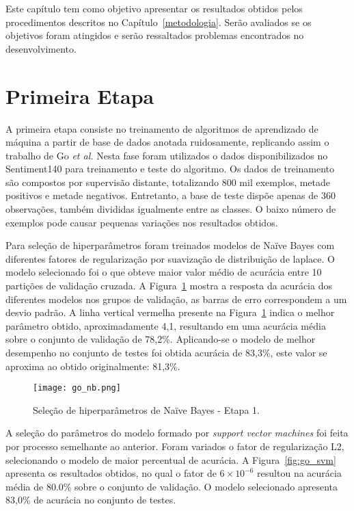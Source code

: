 Este capítulo tem como objetivo apresentar os resultados obtidos pelos procedimentos descritos no
Capítulo~\ref{metodologia}.
Serão avaliados se os objetivos foram atingidos e serão ressaltados problemas encontrados no desenvolvimento.

\section{Primeira Etapa}

A primeira etapa consiste no treinamento de algoritmos de aprendizado de máquina a partir de base de dados anotada
ruidosamente, replicando assim o trabalho de Go \textit{et al.}
Nesta fase foram utilizados o dados disponibilizados no Sentiment140 para treinamento e teste do algoritmo.
Os dados de treinamento são compostos por supervisão distante, totalizando 800 mil exemplos, metade positivos e metade
negativos.
Entretanto, a base de teste dispõe apenas de 360 observações, também divididas igualmente entre as classes.
O baixo número de exemplos pode causar pequenas variações nos resultados obtidos.

Para seleção de hiperparâmetros foram treinados modelos de Naïve Bayes com diferentes fatores de regularização por
suavização de distribuição de laplace.
O modelo selecionado foi o que obteve maior valor médio de acurácia entre 10 partições de validação cruzada.
A Figura~\ref{fig:go_nb} mostra a resposta da acurácia dos diferentes modelos nos grupos de validação, as barras de erro
correspondem a um desvio padrão.
A linha vertical vermelha presente na Figura~\ref{fig:go_nb} indica o melhor parâmetro obtido, aproximadamente 4,1,
resultando em uma acurácia média sobre o conjunto de validação de 78,2\%.
Aplicando-se o modelo de melhor desempenho no conjunto de testes foi obtida acurácia de 83,3\%, este valor se aproxima
ao obtido originalmente: 81,3\%.

\begin{figure}
\begin{center} {
    \begin{center}
    \texttt{[image: go\_nb.png]}
    \caption{Seleção de hiperparâmetros de Naïve Bayes - Etapa 1.}
    \label{fig:go_nb}
    \end{center}
}
\end{center}
\end{figure}

A seleção do parâmetros do modelo formado por \textit{support vector machines} foi feita por processo semelhante ao
anterior.
Foram variados o fator de regularização L2, selecionando o modelo de maior percentual de acurácia.
A Figura~\ref{fig:go_svm} apresenta os resultados obtidos, no qual o fator de $6 \times 10^{-6}$ resultou na acurácia
média de 80.0\% sobre o conjunto de validação.
O modelo selecionado apresenta 83,0\% de acurácia no conjunto de testes.

